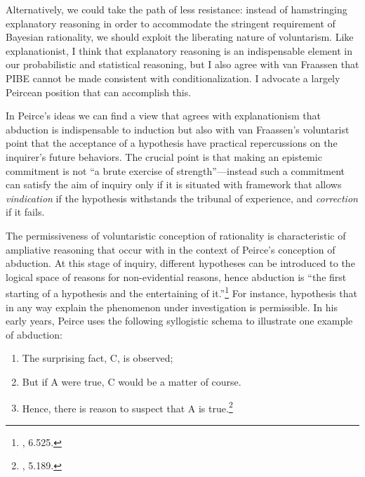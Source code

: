 Alternatively, we could take the path of less resistance: instead of
hamstringing explanatory reasoning in order to accommodate the stringent
requirement of Bayesian rationality, we should exploit the liberating
nature of voluntarism. Like explanationist, I think that explanatory
reasoning is an indispensable element in our probabilistic and
statistical reasoning, but I also agree with van Fraassen that PIBE
cannot be made consistent with conditionalization. I advocate a largely
Peircean position that can accomplish this.

In Peirce's ideas we can find a view that agrees with explanationism
that abduction is indispensable to induction but also with van
Fraassen's voluntarist point that the acceptance of a hypothesis have
practical repercussions on the inquirer's future behaviors. The crucial
point is that making an epistemic commitment is not ``a brute exercise
of strength''---instead such a commitment can satisfy the aim of inquiry
only if it is situated with framework that allows \emph{vindication} if
the hypothesis withstands the tribunal of experience, and
\emph{correction} if it fails.

The permissiveness of voluntaristic conception of rationality is
characteristic of ampliative reasoning that occur with in the context of
Peirce's conception of abduction. At this stage of inquiry, different
hypotheses can be introduced to the logical space of reasons for
non-evidential reasons, hence abduction is ``the first starting of a
hypothesis and the entertaining of it.''\footnote{\cite{CP}, 6.525.} For
instance, hypothesis that in any way explain the phenomenon under
investigation is permissible. In his early years, Peirce uses the
following syllogistic schema to illustrate one example of abduction:

\begin{enumerate}
\def\labelenumi{\arabic{enumi}.}
\tightlist
\item
  The surprising fact, C, is observed;
\item
  But if A were true, C would be a matter of course.
\item
  Hence, there is reason to suspect that A is true.\footnote{\cite{CP},
    5.189.}
\end{enumerate}

